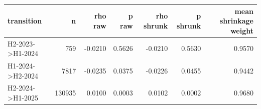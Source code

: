 \begin{tabular}{lrrrrrr}
\toprule
transition & n & rho raw & p raw & rho shrunk & p shrunk & mean shrinkage weight \\
\midrule
H2-2023->H1-2024 & 759 & -0.0210 & 0.5626 & -0.0210 & 0.5630 & 0.9570 \\
H1-2024->H2-2024 & 7817 & -0.0235 & 0.0375 & -0.0226 & 0.0455 & 0.9442 \\
H2-2024->H1-2025 & 130935 & 0.0100 & 0.0003 & 0.0102 & 0.0002 & 0.9680 \\
\bottomrule
\end{tabular}
